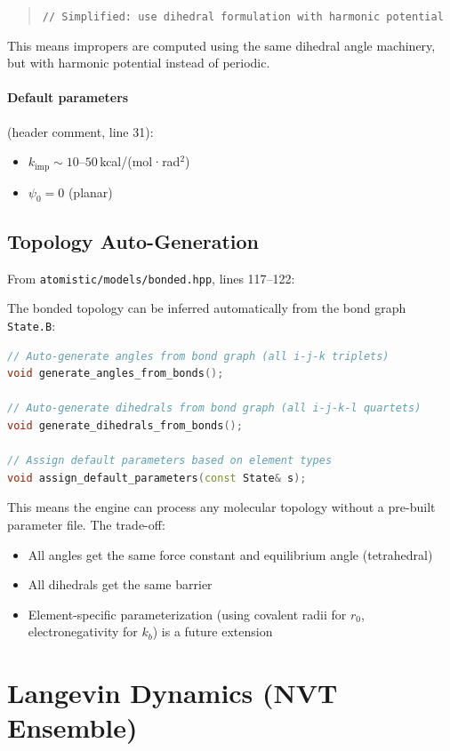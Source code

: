\documentclass[11pt]{article}
\begin{document}
\begin{quote}
\texttt{// Simplified: use dihedral formulation with harmonic potential}
\end{quote}

This means impropers are computed using the same dihedral angle machinery, but with harmonic potential instead of periodic.

\paragraph{Default parameters} (header comment, line 31):
\begin{itemize}
\item $k_{\text{imp}} \sim 10$--$50$\,kcal/(mol·rad$^2$)
\item $\psi_0 = 0$ (planar)
\end{itemize}

\subsection{Topology Auto-Generation}

From \texttt{atomistic/models/bonded.hpp}, lines 117--122:

The bonded topology can be inferred automatically from the bond graph \texttt{State.B}:

\begin{lstlisting}[language=C++]
// Auto-generate angles from bond graph (all i-j-k triplets)
void generate_angles_from_bonds();

// Auto-generate dihedrals from bond graph (all i-j-k-l quartets)
void generate_dihedrals_from_bonds();

// Assign default parameters based on element types
void assign_default_parameters(const State& s);
\end{lstlisting}

This means the engine can process any molecular topology without a pre-built parameter file. The trade-off:
\begin{itemize}
\item All angles get the same force constant and equilibrium angle (tetrahedral)
\item All dihedrals get the same barrier
\item Element-specific parameterization (using covalent radii for $r_0$, electronegativity for $k_b$) is a future extension
\end{itemize}

\section{Langevin Dynamics (NVT Ensemble)}
\end{document}
